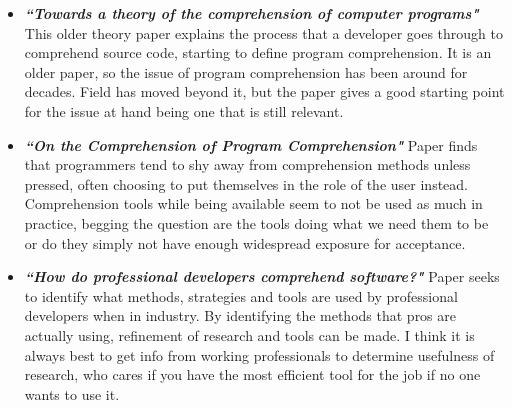 \documentclass[a4paper, 10pt]{IEEEtran}
\begin{document}
\begin{itemize}
    \item \textbf{\textit{“Towards a theory of the comprehension of computer programs"}}
    This older theory paper explains the process that a developer goes through to comprehend source code, starting to define program comprehension. It is an older paper, so the issue of program comprehension has been around for decades. Field has moved beyond it, but the paper gives a good starting point for the issue at hand being one that is still relevant.
    \item \textbf{\textit{“On the Comprehension of Program Comprehension"}}
    Paper finds that programmers tend to shy away from comprehension methods unless pressed, often choosing to put themselves in the role of the user instead. Comprehension tools while being available seem to not be used as much in practice, begging the question are the tools doing what we need them to be or do they simply not have enough widespread exposure for acceptance.
    \item \textbf{\textit{“How do professional developers comprehend software?"}}
    Paper seeks to identify what methods, strategies and tools are used by professional developers when in industry. By identifying the methods that pros are actually using, refinement of research and tools can be made. I think it is always best to get info from working professionals to determine usefulness of research, who cares if you have the most efficient tool for the job if no one wants to use it.
\end{itemize}
\end{document}
